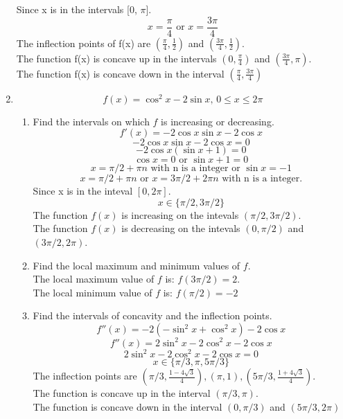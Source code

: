 \documentclass[12pt]{article}
\begin{document}
\begin{enumerate}
        Since x is in the intervals [0, $\pi$].
        \[x = \frac{\pi}{4} \text{ or } x = \frac{3\pi}{4}\]
        The inflection points of f(x) are $(\frac{\pi}{4}, \frac{1}{2})$ and $(\frac{3\pi}{4}, \frac{1}{2})$.\\
        The function f(x) is concave up in the intervals $(0,\frac{\pi}{4})$ and $(\frac{3\pi}{4},\pi)$.\\
        The function f(x) is concave down in the interval $(\frac{\pi}{4}, \frac{3\pi}{4})$
        \setcounter{enumi}{21}
    \item \[f(x) = \cos^2x - 2\sin x \text{, } 0 \leq x \leq 2\pi\]
        \begin{enumerate}
            \item Find the intervals on which $f$ is increasing or decreasing.
                \[f'(x) = -2\cos x \sin x - 2\cos x\]
                \[-2\cos x \sin x - 2\cos x = 0\]
                \[-2\cos x(\sin x + 1) = 0\]
                \[\cos x = 0 \text{ or } \sin x + 1 = 0\]
                \[ x = \pi/2 + \pi n \text{ with n is a integer or } \sin x = -1\]
                \[ x = \pi/2 + \pi n \text{ or } x = 3\pi/2 + 2\pi n \text{ with n is a integer.}\]
                Since x is in the inteval $[0,2\pi]$.
                \[x \in \{\pi/2,3\pi/2\}\]
                The function $f(x)$ is increasing on the intevals $(\pi/2,3\pi/2)$.\\
                The function $f(x)$ is decreasing on the intevals $(0,\pi/2)$ and $(3\pi/2,2\pi)$.
            \item Find the local maximum and minimum values of $f$.\\
                The local maximum value of $f$ is: $f(3\pi/2) = 2$.\\
                The local minimum value of $f$ is: $f(\pi/2) = -2$
            \item Find the intervals of concavity and the inflection points.
                \[f''(x) = -2(-\sin^2 x + \cos^2 x) - 2\cos x\]
                \[f''(x) = 2\sin^2 x -2\cos^2 x - 2\cos x\]
                \[2\sin^2 x -2\cos^2 x - 2\cos x = 0\]
                \[x \in \{\pi/3,\pi,5\pi/3\}\]
                The inflection points are $(\pi/3, \frac{1-4\sqrt{3}}{4}), (\pi,1), (5\pi/3, \frac{1+4\sqrt{3}}{4})$.\\
                The function is concave up in the interval $(\pi/3,\pi)$.\\
                The function is concave down in the interval $(0,\pi/3)$ and $(5\pi/3,2\pi)$
        \end{enumerate}

\end{enumerate}
\end{document}
